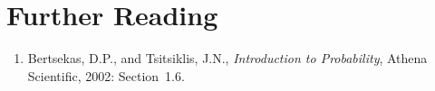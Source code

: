 \section*{Further Reading}

\begin{small}
\begin{enumerate}
\item Bertsekas, D.P., and Tsitsiklis, J.N., \emph{Introduction to Probability}, Athena Scientific, 2002: Section~1.6.
\end{enumerate}
\end{small}

